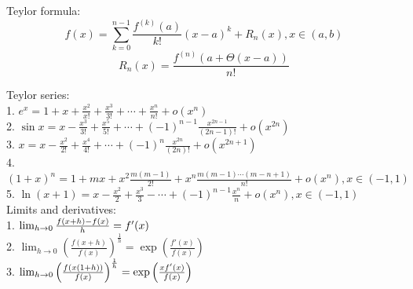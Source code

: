\documentclass{letter}
\begin{document}
Teylor formula:
$$
f(x) = \sum_{k = 0}^{n - 1} \frac{f^{(k)} (a)}{k!} (x - a)^k + R_n(x), x \in (a, b)
$$
$$
R_n(x) = \frac{f^{(n)}(a + \Theta(x - a))}{n!} 
$$

Teylor series: \\
1. $e^x = 1 + x + \frac{x^2}{x!} + \frac{x^3}{3!} + \cdots + \frac{x^n}{n!} + o(x^n) $ \\
2. $ \sin{x} = x - \frac{x^3}{3!} + \frac{x^5}{5!} + \cdots + (-1)^{n-1}\frac{x^{2n-1}}{(2n-1)!} + o(x^{2n}) $ \\
3. $ x = x - \frac{x^2}{2!} + \frac{x^4}{4!} + \cdots + (-1)^n\frac{x^{2n}}{(2n)!} + o(x^{2n+1}) $ \\
4. $ (1+x)^n = 1 + mx + x^2\frac{m(m-1)}{2!} + x^n\frac{m(m-1)\cdots(m-n+1)}{n!} + o(x^n), x \in (-1,1) $ \\
5. $ \ln(x + 1) = x - \frac{x^2}{2} + \frac{x^3}{3} - \cdots + (-1)^{n-1}\frac{x^n}{n} + o(x^n), x \in (-1,1) $ \\

Limits and derivatives: \\

1. $\lim_{h\to 0}{f(x+h)-f(x)\over h}=f'(x)$ \\
2. $\lim_{h\to0}\left(\frac{f(x+h)}{f(x)}\right)^\frac{1}{h}=\exp\left(\frac{f'(x)}{f(x)}\right)$ \\
3. $\lim_{h \to 0}{ \left({f(x(1+h))\over{f(x)}}\right)^{1\over{h}} }=\exp\left(\frac{x f'(x)}{f(x)}\right)$ \\
\end{document}
